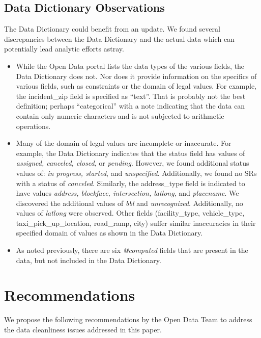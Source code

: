 \documentclass[linenumber]{jdsart}
\begin{document}
\subsection{Data Dictionary Observations} 
\label{sec:datadictionary}
The Data Dictionary could benefit from an update. We found several 
discrepancies between the Data Dictionary and the 
actual data which can potentially lead analytic efforts astray. 

\begin{itemize}
	\item While the Open Data portal lists the data types of the 
	various fields, the Data Dictionary does not. Nor does it provide 
	information on the specifics of various fields, such 
	as constraints or the domain of legal values. For example, the 
	incident\_zip field is specified as ``text''. That is probably not the 
	best definition; perhaps	``categorical'' with a note indicating that 
	the data can contain only numeric characters and is 
	not subjected to arithmetic operations. 

	\item Many of the domain of legal values are incomplete or 
	inaccurate. For example, the Data Dictionary indicates that 
	the status field has values of \textit{assigned, canceled, closed}, 
	or \textit{pending}. However, we found additional status 
	values of: \textit{in progress, started}, and \textit{unspecified}. 
	Additionally, we found no SRs with a status of \textit{canceled}. 
	Similarly, the address\_type field is indicated to have 
	values \textit{address, blockface, intersection, latlong}, and 
	\textit{placename}. We discovered the additional values of 
	\textit{bbl} and \textit{unrecognized}. Additionally, no values of 
	\textit{latlong} were observed. Other fields (facility\_type, 
	vehicle\_type, taxi\_pick\_up\_location, road\_ramp, city) 
	suffer similar inaccuracies in their specified domain of values as
	shown in the Data Dictionary.
	
	\item As noted previously, there are six \textit{@computed} fields that
	are present in the data, but not included in the Data Dictionary.
\end{itemize}


\section{Recommendations} 
\label{sec:recommendations}
We propose the following recommendations by the Open Data Team to address
the data cleanliness issues addressed in this paper.
\end{document}
